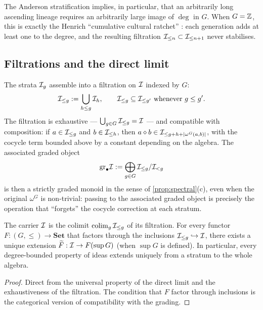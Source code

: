 \begin{remark}
The Anderson stratification implies, in particular, that an
arbitrarily long ascending lineage requires an arbitrarily large image
of $\deg$ in $G$. When $G=\mathbb{Z}$, this is exactly the Henrich
``cumulative cultural ratchet'' \cite{Henrich2015}: each generation
adds at least one to the degree, and the resulting filtration
$\mathcal{I}_{\le n} \subset \mathcal{I}_{\le n+1}$ never stabilises.
\end{remark}

\subsection*{Filtrations and the direct limit}

The strata $\mathcal{I}_g$ assemble into a filtration on $\mathcal{I}$ indexed
by $G$:
\[
  \mathcal{I}_{\le g} \mathrel{:=} \bigcup_{h\le g}\mathcal{I}_h,
  \qquad
  \mathcal{I}_{\le g} \subseteq \mathcal{I}_{\le g'} \text{ whenever } g\le g'.
\]
The filtration is exhaustive --- $\bigcup_{g\in G}\mathcal{I}_{\le g} =
\mathcal{I}$ --- and compatible with composition: if $a\in\mathcal{I}_{\le g}$
and $b\in\mathcal{I}_{\le h}$, then $a\mathbin{\diamond} b\in\mathcal{I}_{\le
g+h+|\omega^G(a,b)|}$, with the cocycle term bounded above by a
constant depending on the algebra. The associated graded object
\[
  \mathrm{gr}_\bullet \mathcal{I} \mathrel{:=} \bigoplus_{g\in G}
    \mathcal{I}_{\le g} / \mathcal{I}_{< g}
\]
is then a strictly graded monoid in the sense of
\cref{prop:spectral}(c), even when the original $\omega^G$ is
non-trivial: passing to the associated graded object is precisely the
operation that ``forgets'' the cocycle correction at each stratum.

\begin{proposition}
\label{prop:direct-limit}
The carrier $\mathcal{I}$ is the colimit
$\operatorname{colim}_g \mathcal{I}_{\le g}$ of its filtration. For every functor
$F : (G,\le) \to \mathbf{Set}$ that factors through the inclusions
$\mathcal{I}_{\le g}\hookrightarrow \mathcal{I}$, there exists a unique
extension $\widetilde F : \mathcal{I} \to F(\sup G)$ (when $\sup G$ is
defined). In particular, every degree-bounded property of ideas
extends uniquely from a stratum to the whole algebra.
\end{proposition}

\begin{proof}
Direct from the universal property of the direct limit and the
exhaustiveness of the filtration. The condition that $F$ factor
through inclusions is the categorical version of compatibility with
the grading.
\end{proof}

